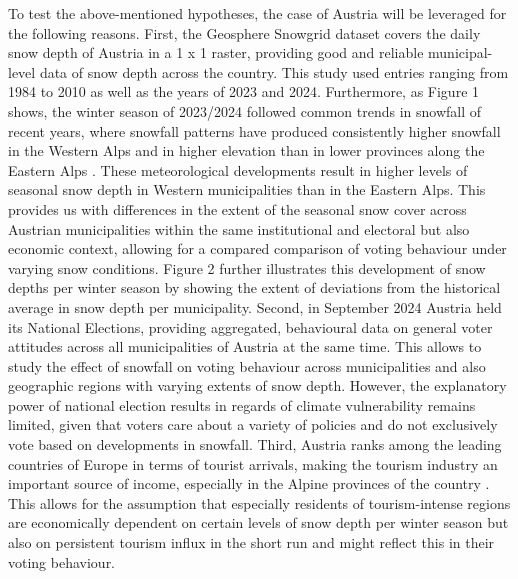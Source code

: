 \documentclass{article}
\begin{document}
To test the above-mentioned hypotheses, the case of Austria will be leveraged for the following reasons. First, the Geosphere Snowgrid dataset covers the daily snow depth of Austria in a 1 x 1 raster, providing good and reliable municipal-level data of snow depth across the country. This study used entries ranging from 1984 to 2010 as well as the years of 2023 and 2024. Furthermore, as Figure 1 shows, the winter season of 2023/2024 followed common trends in snowfall of recent years, where snowfall patterns have produced consistently higher snowfall in the Western Alps and in higher elevation than in lower provinces along the Eastern Alps \parencite{avalanchereport2024, Olefs2020, li2025}. These meteorological developments result in higher levels of seasonal snow depth in Western municipalities than in the Eastern Alps. This provides us with differences in the extent of the seasonal snow cover across Austrian municipalities within the same institutional and electoral but also economic context, allowing for a compared comparison of voting behaviour under varying snow conditions. Figure 2 further illustrates this development of snow depths per winter season by showing the extent of deviations from the historical average in snow depth per municipality. 
Second, in September 2024 Austria held its National Elections, providing aggregated, behavioural data on general voter attitudes across all municipalities of Austria at the same time. This allows to study the effect of snowfall on voting behaviour across municipalities and also geographic regions with varying extents of snow depth. However, the explanatory power of national election results in regards of climate vulnerability remains limited, given that voters care about a variety of policies and do not exclusively vote based on developments in snowfall. 
Third, Austria ranks among the leading countries of Europe in terms of tourist arrivals, making the tourism industry an important source of income, especially in the Alpine provinces of the country \parencite{fritz2025}. This allows for the assumption that especially residents of tourism-intense regions are economically dependent on certain levels of snow depth per winter season but also on persistent tourism influx in the short run and might reflect this in their voting behaviour. 
\end{document}
